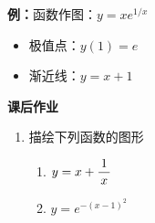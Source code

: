 {\bf 例：}函数作图：$y=xe^{1/x}$
\begin{itemize}
  \setlength{\itemindent}{1cm}
  \item 极值点：$y(1)=e$
  \item 渐近线：$y=x+1$
\end{itemize}

\begin{center}
\end{center}

\begin{ext}
	{\bf 课后作业}
	
	\begin{enumerate}
	  \item 描绘下列函数的图形
	  \begin{enumerate}[(1)]
		\item $y=x+\displaystyle\frac{\,{1}\,}{\,{x}\,}$
		\item $y=e^{-(x-1)^2}$
	  \end{enumerate}
	\end{enumerate}
\end{ext}

